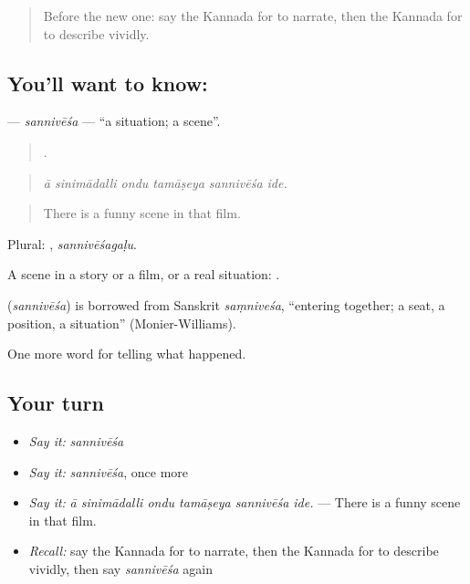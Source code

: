 \label{lesson:KA-C343-sannivesa}



\begin{quote}
Before the new one: say the Kannada for to narrate, then the Kannada for to describe vividly.
\end{quote}

\subsection*{You'll want to know: }
\textbf{} — \emph{sannivēśa} — \textquotedblleft{}a situation; a scene\textquotedblright{}.

\begin{quote}
     .
\end{quote}

\begin{quote}
\emph{ā sinimādalli ondu tamāṣeya sannivēśa ide.}
\end{quote}

\begin{quote}
There is a funny scene in that film.
\end{quote}

Plural: , \emph{sannivēśagaḷu}.

A scene in a story or a film, or a real situation:  .

\begin{cousinweb}
\textbf{} (\emph{sannivēśa}) is borrowed from Sanskrit \emph{saṃniveśa}, \textquotedblleft{}entering together; a seat, a position, a situation\textquotedblright{} (Monier-Williams).
\end{cousinweb}

\begin{grammarlens}[title={What you've built}]
One more word for telling what happened.
\end{grammarlens}

\subsection*{Your turn}
\begin{itemize}
\raggedright
  \item \emph{Say it:} \emph{sannivēśa}
  \item \emph{Say it:} \emph{sannivēśa}, once more
  \item \emph{Say it:} \emph{ā sinimādalli ondu tamāṣeya sannivēśa ide.} — There is a funny scene in that film.
  \item \emph{Recall:} say the Kannada for to narrate, then the Kannada for to describe vividly, then say \emph{sannivēśa} again
\end{itemize}

